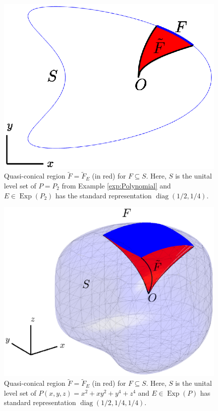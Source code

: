 \documentclass[11pt]{article}
\theoremstyle{remark}
\newcommand\Exp{\operatorname{Exp}}
\newcommand\diag{\operatorname{diag}}
\begin{document}
\begin{figure}[!htb]
    \centering
    \includegraphics[scale=0.7, trim={1cm 1cm 1cm 0.5cm},clip]{Fig3.eps}
    \caption{Quasi-conical region $\widetilde{F}=\widetilde{F}_E$ (in red) for $F\subseteq S$. Here, $S$ is the unital level set of $P=P_2$ from Example \ref{exp:Polynomial} and $E\in\Exp(P_2)$ has the standard representation $\diag(1/2,1/4)$.}
    \label{fig:level_set_F}
\end{figure}

\begin{figure}[!htb]
    \centering
    \includegraphics[scale=0.7, trim={1cm 3cm 1cm 2cm},clip]{Fig4.eps}
    \caption{Quasi-conical region $\widetilde{F}=\widetilde{F}_E$ (in red) for $F\subseteq S$. Here, $S$ is the unital level set of $P(x,y,z) = x^2 + xy^2 + y^4 + z^4$ and $E\in\Exp(P)$ has standard representation $\diag(1/2,1/4,1/4)$. }
    \label{fig:level_set_F_3D}
\end{figure}
\end{document}
